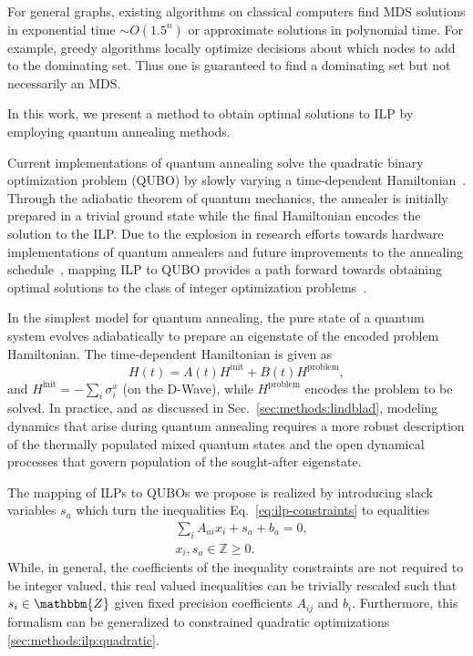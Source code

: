 \documentclass[prd,twocolumn,tightenlines,preprintnumbers,showpacs,superscriptaddress,notitlepage,nofootinbib,eqsecnum,floatfix,longbibliography,aps,10pt]{revtex4-2}
\begin{document}
For general graphs, existing algorithms on classical computers find MDS solutions in exponential time $\sim O( 1.5^n)$ \cite{Fomin2009, vanRooij2009} or approximate solutions in polynomial time. For example, greedy algorithms locally optimize decisions about which nodes to add to the dominating set.
Thus one is guaranteed to find a dominating set but not necessarily an MDS.

In this work, we present a method to obtain optimal solutions to ILP by employing quantum annealing methods.

Current implementations of quantum annealing solve the quadratic binary optimization problem (QUBO) by slowly varying a time-dependent Hamiltonian~\cite{1998PhRvE..58.5355K, 2000quant.ph..1106F, RevModPhys.80.1061}.
Through the adiabatic theorem of quantum mechanics, the annealer is initially prepared in a trivial ground state while the final Hamiltonian encodes the solution to the ILP.
Due to the explosion in research efforts towards hardware implementations of quantum annealers and future improvements to the annealing schedule~\cite{doi:10.7566/JPSJ.89.044001}, mapping ILP to QUBO provides a path forward towards obtaining optimal solutions to the class of integer optimization problems~\cite{2018Glover}.

In the simplest model for quantum annealing, the pure state of a quantum system evolves adiabatically to prepare an eigenstate of the encoded problem Hamiltonian. The time-dependent Hamiltonian is given as
\begin{equation}
 H(t) = A(t) H^{\textrm{init}} + B(t) H^{\textrm{problem}}, \label{eq:tdhamiltonian}
\end{equation}
and $H^\textrm{init}=-\sum_i\sigma^x_i$ (on the D-Wave), while $H^\textrm{problem}$ encodes the problem to be solved. In practice, and as discussed in Sec.~\ref{sec:methods:lindblad}, modeling dynamics that arise during quantum annealing requires a more robust description of the thermally populated mixed quantum states and the open dynamical processes that govern population of the sought-after eigenstate.

The mapping of ILPs to QUBOs we propose is realized by introducing slack variables $s_a$ which turn the inequalities Eq.~\eqref{eq:ilp-constraints} to equalities
\begin{align}
  \label{eq:ilp:slack}
  & \sum_i A_{a i}x_i + s_a + b_a = 0, \\
  & x_i, s_a \in \mathbb{Z} \geq 0.
\end{align}
While, in general, the coefficients of the inequality constraints are not required to be integer valued, this real valued inequalities can be trivially rescaled such that $s_i \in \mathbbm{Z}$ given fixed precision coefficients $A_{ij}$ and $b_i$.
Furthermore, this formalism can be generalized to constrained quadratic optimizations \ref{sec:methods:ilp:quadratic}.
\end{document}
